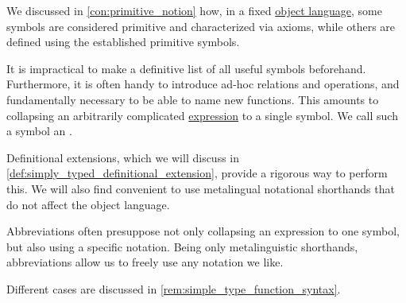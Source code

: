 \begin{concept}\label{con:metalingual_abbreviation}\mimprovised
  We discussed in \cref{con:primitive_notion} how, in a fixed \hyperref[con:metalogic]{object language}, some symbols are considered primitive and characterized via axioms, while others are defined using the established primitive symbols.

  It is impractical to make a definitive list of all useful symbols beforehand. Furthermore, it is often handy to introduce ad-hoc relations and operations, and fundamentally necessary to be able to name new functions. This amounts to collapsing an arbitrarily complicated \hyperref[con:expression]{expression} to a single symbol. We call such a symbol an .

  Definitional extensions, which we will discuss in \cref{def:simply_typed_definitional_extension}, provide a rigorous way to perform this. We will also find convenient to use metalingual notational shorthands that do not affect the object language.
\end{concept}
\begin{comments}
  \item Abbreviations often presuppose not only collapsing an expression to one symbol, but also using a specific notation. Being only metalinguistic shorthands, abbreviations allow us to freely use any notation we like.

  Different cases are discussed in \cref{rem:simple_type_function_syntax}.
\end{comments}

